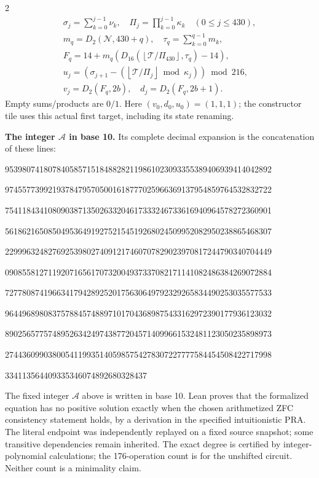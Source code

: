 \documentclass[10pt]{article}
\newcommand{\fl}[1]{\left\lfloor#1\right\rfloor}
\begin{document}
\begin{multicols}{2}
\[\begin{gathered}
\sigma_j=\sum_{k=0}^{j-1}\nu_k,\quad
\Pi_j=\prod_{k=0}^{j-1}\kappa_k\quad(0\le j\le430),\\
m_q=D_2(\mathcal N,430+q),\quad \tau_q=\sum_{k=0}^{q-1}m_k,\\
F_q=14+m_q(D_{16}(\fl{\mathcal T/\Pi_{430}},\tau_q)-14),\\
u_j=(\sigma_{j+1}-(\fl{\mathcal T/\Pi_j}\bmod\kappa_j))\bmod216,\\
v_j=D_2(F_q,2b),\quad d_j=D_2(F_q,2b+1).
\end{gathered}
\]
Empty sums/products are $0/1$. Here $(v_0,d_0,u_0)=(1,1,1)$; the constructor tile
uses this actual first target, including its state renaming.

\textbf{The integer $\mathcal A$ in base 10.}
Its complete decimal expansion is the concatenation of these lines:\par
\begingroup\fontsize{7.7}{8.2}\selectfont{}\par
95398074180784058571518488282119861023093355389406939414042892\par
97455773992193784795705001618777025966369137954859764532832722\par
75411843410809038713502633204617333246733616940964578272360901\par
56186216508504953649192752154519268024509952082950238865468307\par
22999632482769253980274091217460707829023970817244790340704449\par
09085581271192071656170732004937337082171141082486384269072884\par
72778087419663417942892520175630649792329265834490253035577533\par
96449689808375788457488971017043689875433162972390177936123032\par
89025657757489526342497438772045714099661532481123050235898973\par
27443609903800541199351405985754278307227777584454508422717998\par
334113564409335346074892680328437\par
\endgroup
\normalfont\fontsize{7.7}{8.2}\selectfont
The fixed integer $\mathcal A$ above is written in base 10. Lean proves that the formalized equation has no positive solution exactly
when the chosen arithmetized ZFC consistency statement holds, by a derivation
in the specified intuitionistic PRA. The literal endpoint was independently
replayed on a fixed source snapshot; some transitive dependencies remain
inherited. The exact degree is certified by integer-polynomial calculations;
the 176-operation count is for the unshifted circuit. Neither count is a
minimality claim.
\end{multicols}
\end{document}
